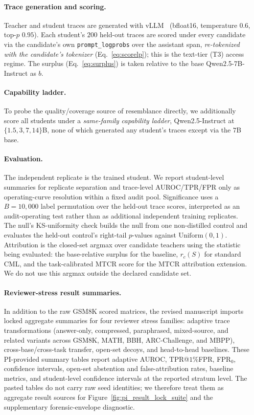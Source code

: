 \documentclass[journal]{IEEEtran}
\begin{document}
\paragraph{Trace generation and scoring.}
Teacher and student traces are generated with vLLM~\citep{kwon2023vllm}
(bfloat16, temperature $0.6$, top-$p$ $0.95$).
Each student's $200$ held-out traces are scored under every candidate via the candidate's own
\texttt{prompt\_logprobs} over the assistant span, \emph{re-tokenized with the candidate's tokenizer}
(Eq.~\eqref{eq:scorelp}); this is the text-tier (T3) access regime. The surplus
(Eq.~\eqref{eq:surplus}) is taken relative to the base Qwen2.5-7B-Instruct as $b$.

\paragraph{Capability ladder.}
To probe the quality/coverage source of resemblance directly, we additionally score all students
under a \emph{same-family capability ladder}, Qwen2.5-Instruct at $\{1.5,3,7,14\}$B, none of which
generated any student's traces except via the $7$B base.

\paragraph{Evaluation.}
The independent replicate is the trained student. We report student-level summaries
for replicate separation and trace-level AUROC/TPR/FPR only as operating-curve
resolution within a fixed audit pool. Significance uses a $B=10{,}000$ label
permutation over the held-out trace scores, interpreted as an audit-operating test
rather than as additional independent training replicates. The null's KS-uniformity
check builds the null from one non-distilled control and evaluates the held-out
control's right-tail $p$-values against $\mathrm{Uniform}(0,1)$. Attribution is the
closed-set argmax over candidate teachers using the statistic being evaluated:
the base-relative surplus for the baseline, $r_c(S)$ for standard CML, and the
task-calibrated MTCR score for the MTCR attribution extension. We do not use this
argmax outside the declared candidate set.

\paragraph{Reviewer-stress result summaries.}
In addition to the raw GSM8K scored matrices, the revised manuscript imports locked
aggregate summaries for four reviewer stress families: adaptive trace transformations
(answer-only, compressed, paraphrased, mixed-source, and related variants across
GSM8K, MATH, BBH, ARC-Challenge, and MBPP), cross-base/cross-task transfer,
open-set decoys, and head-to-head baselines. These PI-provided summary tables
report adaptive AUROC, TPR@$1\%$FPR, FPR$_0$, confidence intervals, open-set
abstention and false-attribution rates, baseline metrics, and student-level
confidence intervals at the reported stratum level. The pasted tables do not carry
raw seed identities; we therefore treat them as aggregate result sources for
Figure~\ref{fig:pi_result_lock_suite} and the supplementary forensic-envelope
diagnostic.
\end{document}
